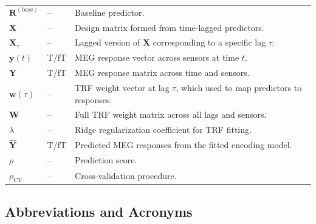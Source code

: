 \documentclass[12pt]{article}
\begin{document}
\begin{longtable}{l l p{11.2cm}}
$\mathbf{R}^{(\mathrm{base})}$ & -- & Baseline predictor. \\
$\mathbf{X}$ & -- & Design matrix formed from time-lagged predictors.\\
$\mathbf{X}_{\tau}$ & -- & Lagged version of $\mathbf{X}$ corresponding to a specific lag $\tau$.\\
$\boldsymbol{y}(t)$ & \si{\tesla}/\si{\femto\tesla} & MEG response vector across sensors at time $t$.\\
$\mathbf{Y}$ & \si{\tesla}/\si{\femto\tesla} & MEG response matrix across time and sensors.\\
$\mathbf{w}(\tau)$ & -- & TRF weight vector at lag $\tau$, which used to map predictors to responses.\\
$\mathbf{W}$ & -- & Full TRF weight matrix across all lags and sensors.\\
$\lambda$ & -- & Ridge regularization coefficient for TRF fitting.\\
$\hat{\mathbf{Y}}$ & \si{\tesla}/\si{\femto\tesla} & Predicted MEG responses from the fitted encoding model.\\
$\rho$ & -- & Prediction score.\\
$\rho_{\mathrm{CV}}$ & -- & Cross-validation procedure.\\
\end{longtable}








\subsection{Abbreviations and Acronyms}
\end{document}
